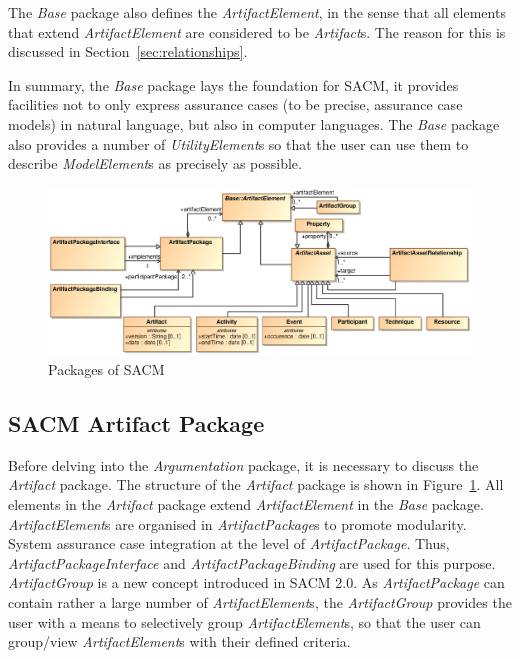 The \textit{Base} package also defines the \textit{ArtifactElement}, in the sense that all elements that extend \textit{ArtifactElement} are considered to be \textit{Artifact}s. The reason for this is discussed in Section~\ref{sec:relationships}. 

In summary, the \textit{Base} package lays the foundation for SACM, it provides facilities not to only express assurance cases (to be precise, assurance case models) in natural language, but also in computer languages. The \textit{Base} package also provides a number of \textit{UtilityElement}s so that the user can use them to describe \textit{ModelElement}s as precisely as possible.

\begin{figure}
	\centering
	\includegraphics[width=1\linewidth]{Artifact.eps}
	\caption{Packages of SACM}
	\label{fig:arti}
\end{figure}

\subsection{SACM Artifact Package}
\label{sec:artiPack}
Before delving into the \textit{Argumentation} package, it is necessary to discuss the \textit{Artifact} package. The structure of the \textit{Artifact} package is shown in Figure~\ref{fig:arti}. 
All elements in the \textit{Artifact} package extend \textit{ArtifactElement} in the \textit{Base} package. \textit{ArtifactElement}s are organised in \textit{ArtifactPackage}s to promote modularity. System assurance case integration at the level of \textit{ArtifactPackage}. Thus, \textit{ArtifactPackageInterface} and \textit{ArtifactPackageBinding} are used for this purpose.
\textit{ArtifactGroup} is a new concept introduced in SACM 2.0. As \textit{ArtifactPackage} can contain rather a large number of \textit{ArtifactElement}s, the \textit{ArtifactGroup} provides the user with a means to selectively group \textit{ArtifactElement}s, so that the user can group/view \textit{ArtifactElement}s with their defined criteria.

